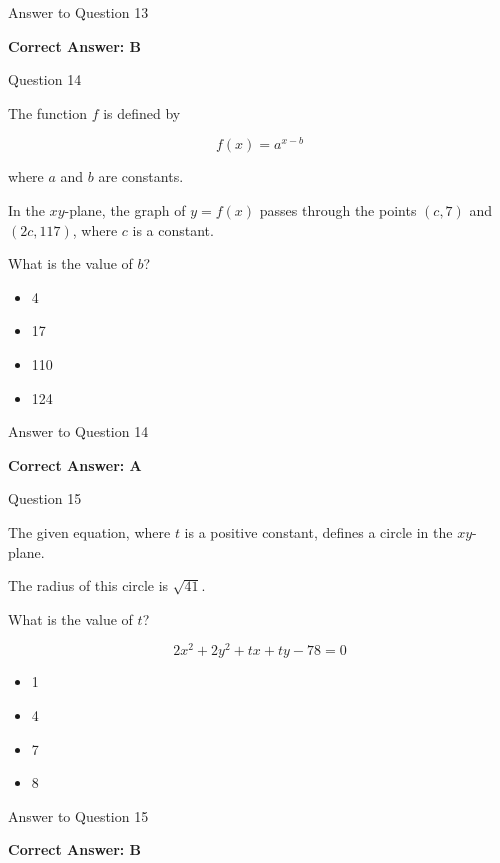 \documentclass{beamer}
\begin{document}
\begin{frame}{Answer to Question 13}

\textbf{Correct Answer: B}

\end{frame}


\begin{frame}{Question 14}

The function $f$ is defined by

\[
f(x)=a^{x-b}
\]

where $a$ and $b$ are constants.

In the $xy$-plane, the graph of $y=f(x)$ passes through the points $(c,7)$ and $(2c,117)$, where $c$ is a constant.

What is the value of $b$?

\begin{itemize}
    \item[A.] 4
    \item[B.] 17
    \item[C.] 110
    \item[D.] 124
\end{itemize}

\end{frame}

\begin{frame}{Answer to Question 14}

\textbf{Correct Answer: A}

\end{frame}


\begin{frame}{Question 15}

The given equation, where $t$ is a positive constant, defines a circle in the $xy$-plane.

The radius of this circle is $\sqrt{41}$.

What is the value of $t$?

\[
2x^2+2y^2+tx+ty-78=0
\]

\begin{itemize}
    \item[A.] 1
    \item[B.] 4
    \item[C.] 7
    \item[D.] 8
\end{itemize}

\end{frame}

\begin{frame}{Answer to Question 15}

\textbf{Correct Answer: B}

\end{frame}
\end{document}
